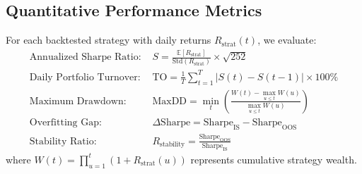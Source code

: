 \subsection{Quantitative Performance Metrics}
For each backtested strategy with daily returns $R_{\text{strat}}(t)$, we evaluate:
\begin{align}
    \text{Annualized Sharpe Ratio: } & S = \frac{\mathbb{E}[R_{\text{strat}}]}{\text{Std}(R_{\text{strat}})} \times \sqrt{252} \\
    \text{Daily Portfolio Turnover: } & \text{TO} = \frac{1}{T} \sum_{t=1}^T |S(t) - S(t-1)| \times 100\% \\
    \text{Maximum Drawdown: } & \text{MaxDD} = \min_{t} \left( \frac{W(t) - \max_{u \le t} W(u)}{\max_{u \le t} W(u)} \right) \\
    \text{Overfitting Gap: } & \Delta \text{Sharpe} = \text{Sharpe}_{\text{IS}} - \text{Sharpe}_{\text{OOS}} \\
    \text{Stability Ratio: } & R_{\text{stability}} = \frac{\text{Sharpe}_{\text{OOS}}}{\text{Sharpe}_{\text{IS}}}
\end{align}
where $W(t) = \prod_{u=1}^t (1 + R_{\text{strat}}(u))$ represents cumulative strategy wealth.
